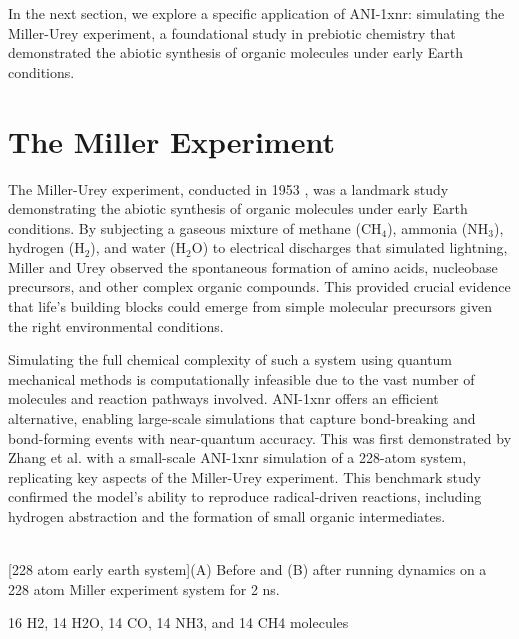 In the next section, we explore a specific application of ANI-1xnr: simulating the Miller-Urey experiment, a foundational study in prebiotic chemistry that demonstrated the abiotic synthesis of organic molecules under early Earth conditions. 

\section{The Miller Experiment}
\label{sec:miller_experiment}

The Miller-Urey experiment, conducted in 1953 \cite{miller_experiment}, was a landmark study demonstrating the abiotic synthesis of organic molecules under early Earth conditions. By subjecting a gaseous mixture of methane ($\text{CH}_4$), ammonia ($\text{NH}_3$), hydrogen ($\text{H}_2$), and water ($\text{H}_2\text{O}$) to electrical discharges that simulated lightning, Miller and Urey observed the spontaneous formation of amino acids, nucleobase precursors, and other complex organic compounds. This provided crucial evidence that life's building blocks could emerge from simple molecular precursors given the right environmental conditions.

Simulating the full chemical complexity of such a system using quantum mechanical methods is computationally infeasible due to the vast number of molecules and reaction pathways involved. ANI-1xnr offers an efficient alternative, enabling large-scale simulations that capture bond-breaking and bond-forming events with near-quantum accuracy. This was first demonstrated by Zhang et al. \cite{ani-1xnr} with a small-scale ANI-1xnr simulation of a 228-atom system, replicating key aspects of the Miller-Urey experiment. This benchmark study confirmed the model’s ability to reproduce radical-driven reactions, including hydrogen abstraction and the formation of small organic intermediates.

\begin{flushleft}
\begin{multiFigure}
     \\
[228 atom early earth system]{(A) Before and (B) after running dynamics on a 228 atom Miller experiment system for 2 ns.
}
\label{fig:228_atom_run}
\end{multiFigure}
\end{flushleft}

16 H2, 14 H2O, 14 CO, 14 NH3, and 14 CH4 molecules

